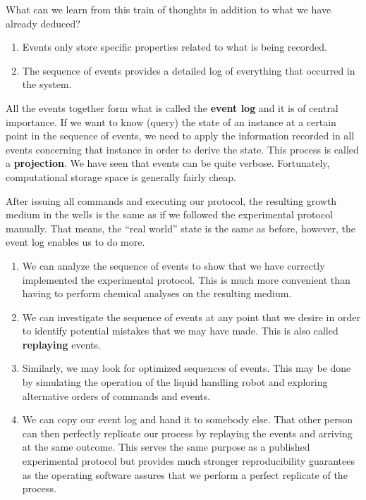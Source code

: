 \documentclass[
  a4paper,
]{scrartcl}
\providecommand{\tightlist}{%
  \setlength{\itemsep}{0pt}\setlength{\parskip}{0pt}}
\begin{document}
What can we learn from this train of thoughts in addition to what we
have already deduced?

\begin{enumerate}
\def\labelenumi{\arabic{enumi}.}
\tightlist
\item
  Events only store specific properties related to what is being
  recorded.
\item
  The sequence of events provides a detailed log of everything that
  occurred in the system.
\end{enumerate}

All the events together form what is called the \textbf{event log} and
it is of central importance. If we want to know (query) the state of an
instance at a certain point in the sequence of events, we need to apply
the information recorded in all events concerning that instance in order
to derive the state. This process is called a \textbf{projection}. We
have seen that events can be quite verbose. Fortunately, computational
storage space is generally fairly cheap.

After issuing all commands and executing our protocol, the resulting
growth medium in the wells is the same as if we followed the
experimental protocol manually. That means, the ``real world'' state is
the same as before, however, the event log enables us to do more.

\begin{enumerate}
\def\labelenumi{\arabic{enumi}.}
\tightlist
\item
  We can analyze the sequence of events to show that we have correctly
  implemented the experimental protocol. This is much more convenient
  than having to perform chemical analyses on the resulting medium.
\item
  We can investigate the sequence of events at any point that we desire
  in order to identify potential mistakes that we may have made. This is
  also called \textbf{replaying} events.
\item
  Similarly, we may look for optimized sequences of events. This may be
  done by simulating the operation of the liquid handling robot and
  exploring alternative orders of commands and events.
\item
  We can copy our event log and hand it to somebody else. That other
  person can then perfectly replicate our process by replaying the
  events and arriving at the same outcome. This serves the same purpose
  as a published experimental protocol but provides much stronger
  reproducibility guarantees as the operating software assures that we
  perform a perfect replicate of the process.
\end{enumerate}
\end{document}
